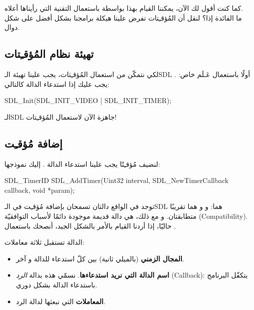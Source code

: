 \begin{information}
كما كنت أقول لك الآن، يمكننا القيام بهذا بواسطة
باستعمال التقنية التي رأيناها أعلاه.\\
ما الفائدة إذا؟ لنقل أن المُؤقـِتات تفرض علينا هيكلة برامجنا بشكل أفضل على شكل دوال.
\end{information}

\subsection{تهيئة نظام المُؤقـِتات}

لكي نتمكّن من استعمال المُؤقـِتات، يجب علينا تهيئة الـ\textenglish{SDL}
أولًا باستعمال عَـلَم خاص:
.
يجب عليك إذا استدعاء الدالة
كالتالي:

\begin{Csource}
SDL_Init(SDL_INIT_VIDEO | SDL_INIT_TIMER);
\end{Csource}

الـ\textenglish{SDL}
جاهزة الآن لاستعمال المُؤقـِتات!

\subsection{إضافة مُؤقـِت}

لنضيف مُؤقـِتًا يجب علينا استدعاء الدالة
.
إليك نموذجها:

\begin{Csource}
SDL_TimerID SDL_AddTimer(Uint32 interval, SDL_NewTimerCallback callback, void *param);
\end{Csource}

توجد في الواقع دالتان تسمحان بإضافة مُؤقـِت في الـ\textenglish{SDL}
هما:
و
و هما تقريبًا متطابقتان. و مع ذلك،
هي دالة قديمة موجودة دائمًا لأسباب التوافقيّة
(\textenglish{Compatibility}).
حاليّا، إذا أردنا القيام بالأمر بالشكل الجيد، أنصحك باستعمال
.

الدالة تستقبل ثلاثة معاملات:

\begin{itemize}
	\item \textbf{المجال الزمني}
	(بالميلي ثانية) بين كلّ استدعاء للدالة و آخر.
	\item \textbf{اسم الدالة التي نريد استدعاءها}.
	نسمّي هذه بدالة
	\textit{الرد}
	(\textenglish{Callback}):
	يتكفّل البرنامج باستدعاء الدالة بشكل دوري.
	\item \textbf{المعاملات}
	التي نبعثها لدالة الرد.
\end{itemize}

